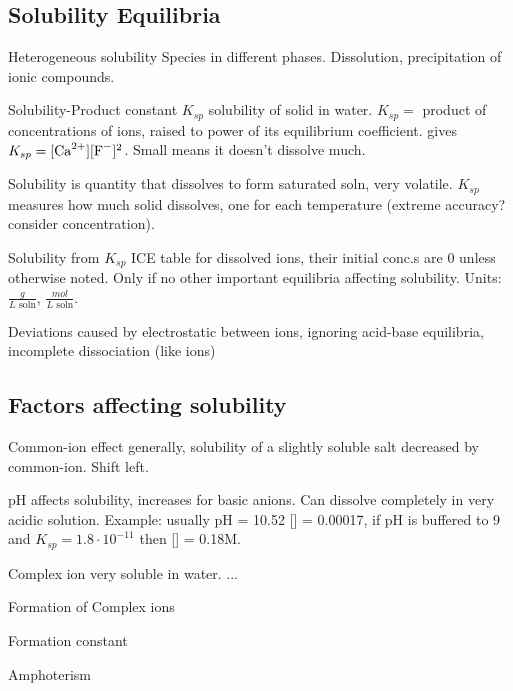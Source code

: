 \begin{mdframed}
\begin{multicols}{2}
\subsection{Solubility Equilibria}
\begin{compactdesc}
\item[Heterogeneous solubility] Species in different phases. Dissolution,
    precipitation of ionic compounds.
\item[Solubility-Product constant] $K_{sp}$ solubility of solid in water.
    $K_{sp} = $ product of concentrations of ions, raised to power of its
    equilibrium coefficient.
     gives $K_{sp} = [\ce{Ca^{2+}}][\ce{F^-}]^2$. Small means
    it doesn't dissolve much.
\item[Solubility] is quantity that dissolves to form saturated soln,
    very volatile.
    $K_{sp}$ measures how much solid dissolves, one for each temperature
    (extreme accuracy? consider concentration).

\item[Solubility from $K_{sp}$] ICE table for dissolved ions, their initial conc.s are 0 unless otherwise noted. Only if no
    other important equilibria affecting solubility.
    Units: $\frac{g}{L \text{ soln}}$, $\frac{mol}{L     \text{ soln}}$.
\item[Deviations] caused by electrostatic between ions, ignoring
    acid-base equilibria, incomplete dissociation (like  ions)
\end{compactdesc}
\end{multicols}
\end{mdframed}





\begin{mdframed}
\begin{multicols}{2}
\subsection{Factors affecting solubility}
\begin{compactdesc}
\item[Common-ion effect] generally, solubility of a slightly soluble salt
    decreased by common-ion. Shift left.
\item[pH affects solubility,] increases for basic anions.
    Can dissolve completely in very acidic solution.
    Example:  usually pH = 10.52 [] = 0.00017, if
    pH is buffered to 9 and $K_{sp} = 1.8\cdot10^{-11}$ then []
    = 0.18M.
\item[Complex ion] very soluble in water. ...
\item[Formation of Complex ions]
\item[Formation constant]
\item[Amphoterism]
\end{compactdesc}
\end{multicols}
\end{mdframed}






